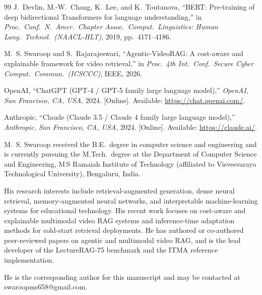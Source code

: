 \documentclass[journal]{IEEEtran}
\begin{document}
\begin{thebibliography}{99}
J.~Devlin, M.-W.~Chang, K.~Lee, and K.~Toutanova,
``BERT: Pre-training of deep bidirectional Transformers for language
understanding,''
in \emph{Proc.\ Conf.\ N.\ Amer.\ Chapter Assoc.\ Comput.\ Linguistics:
Human Lang.\ Technol.\ (NAACL-HLT)},
2019, pp.~4171--4186.

M.~S. Swaroop and S.~Rajarajeswari,
``Agentic-VideoRAG: A cost-aware and explainable framework for video
retrieval,''
in \emph{Proc.\ 4th Int.\ Conf.\ Secure Cyber Comput.\ Commun.\
(ICSCCC)}, IEEE, 2026.

OpenAI,
``ChatGPT (GPT-4 / GPT-5 family large language model),''
\emph{OpenAI, San Francisco, CA, USA}, 2024.
[Online].  Available: \url{https://chat.openai.com/}.

Anthropic,
``Claude (Claude 3.5 / Claude 4 family large language model),''
\emph{Anthropic, San Francisco, CA, USA}, 2024.
[Online].  Available: \url{https://claude.ai/}.

\end{thebibliography}


\begin{IEEEbiographynophoto}{M.~S. Swaroop}
received the B.E.~degree in computer science and engineering and is
currently pursuing the M.Tech.~degree at the Department of Computer
Science and Engineering, M\,S Ramaiah Institute of Technology
(affiliated to Visvesvaraya Technological University), Bengaluru,
India.

His research interests include retrieval-augmented generation, dense
neural retrieval, memory-augmented neural networks, and interpretable
machine-learning systems for educational technology.  His recent work
focuses on cost-aware and explainable multimodal video RAG systems
and inference-time adaptation methods for cold-start retrieval
deployments.  He has authored or co-authored peer-reviewed papers on
agentic and multimodal video RAG, and is the lead developer of the
LectureRAG-75 benchmark and the ITMA reference implementation.

He is the corresponding author for this manuscript and may be
contacted at swaroopms658@gmail.com.
\end{IEEEbiographynophoto}
\end{document}
